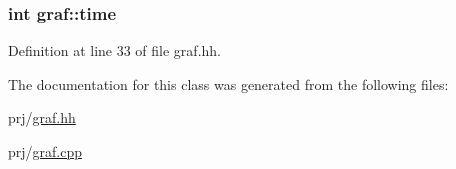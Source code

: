 \hypertarget{classgraf_a9202cb6ab351f5bbdbb79de440ab1fb5}{
\subsubsection[{time}]{\setlength{\rightskip}{0pt plus 5cm}int {\bf graf\-::time}}}\label{classgraf_a9202cb6ab351f5bbdbb79de440ab1fb5}


\-Definition at line 33 of file graf.\-hh.



\-The documentation for this class was generated from the following files\-:\begin{DoxyCompactItemize}
\item 
prj/\hyperlink{graf_8hh}{graf.\-hh}\item 
prj/\hyperlink{graf_8cpp}{graf.\-cpp}\end{DoxyCompactItemize}
